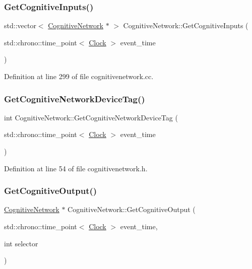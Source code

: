 \subsubsection{\texorpdfstring{Get\+Cognitive\+Inputs()}{GetCognitiveInputs()}}
{\footnotesize\ttfamily std\+::vector$<$ \mbox{\hyperlink{class_cognitive_network}{Cognitive\+Network}} $\ast$ $>$ Cognitive\+Network\+::\+Get\+Cognitive\+Inputs (\begin{DoxyParamCaption}\item[{std\+::chrono\+::time\+\_\+point$<$ \mbox{\hyperlink{universe_8h_a0ef8d951d1ca5ab3cfaf7ab4c7a6fd80}{Clock}} $>$}]{event\+\_\+time }\end{DoxyParamCaption})}



Definition at line 299 of file cognitivenetwork.\+cc.

\mbox{\label{class_cognitive_network_af33f3ff9dd829da73d183d2624f24964}} 
\subsubsection{\texorpdfstring{Get\+Cognitive\+Network\+Device\+Tag()}{GetCognitiveNetworkDeviceTag()}}
{\footnotesize\ttfamily int Cognitive\+Network\+::\+Get\+Cognitive\+Network\+Device\+Tag (\begin{DoxyParamCaption}\item[{std\+::chrono\+::time\+\_\+point$<$ \mbox{\hyperlink{universe_8h_a0ef8d951d1ca5ab3cfaf7ab4c7a6fd80}{Clock}} $>$}]{event\+\_\+time }\end{DoxyParamCaption})\hspace{0.3cm}{\ttfamily [inline]}}



Definition at line 54 of file cognitivenetwork.\+h.

\mbox{\label{class_cognitive_network_a947fa4c50fecc4008d2bcfc96a272ffc}} 
\subsubsection{\texorpdfstring{Get\+Cognitive\+Output()}{GetCognitiveOutput()}}
{\footnotesize\ttfamily \mbox{\hyperlink{class_cognitive_network}{Cognitive\+Network}} $\ast$ Cognitive\+Network\+::\+Get\+Cognitive\+Output (\begin{DoxyParamCaption}\item[{std\+::chrono\+::time\+\_\+point$<$ \mbox{\hyperlink{universe_8h_a0ef8d951d1ca5ab3cfaf7ab4c7a6fd80}{Clock}} $>$}]{event\+\_\+time,  }\item[{int}]{selector }\end{DoxyParamCaption})}



